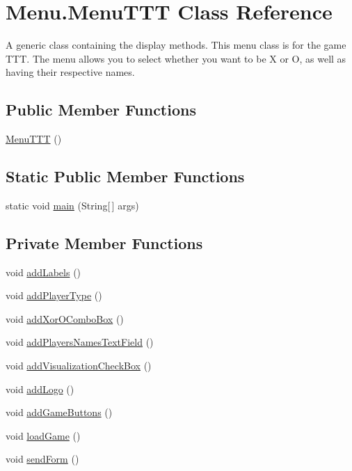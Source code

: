 \hypertarget{class_menu_1_1_menu_t_t_t}{}\section{Menu.\+Menu\+T\+T\+T Class Reference}
\label{class_menu_1_1_menu_t_t_t}


A generic class containing the display methods. This menu class is for the game T\+T\+T. The menu allows you to select whether you want to be X or O, as well as having their respective names.  


\subsection*{Public Member Functions}
\begin{DoxyCompactItemize}
\item 
\hyperlink{class_menu_1_1_menu_t_t_t_ad4e37e7c616519cc089666adf3bda2ad}{Menu\+T\+T\+T} ()
\end{DoxyCompactItemize}
\subsection*{Static Public Member Functions}
\begin{DoxyCompactItemize}
\item 
static void \hyperlink{class_menu_1_1_menu_t_t_t_aadb5ca51346ce541623408f04e806ba3}{main} (String\mbox{[}$\,$\mbox{]} args)
\end{DoxyCompactItemize}
\subsection*{Private Member Functions}
\begin{DoxyCompactItemize}
\item 
void \hyperlink{class_menu_1_1_menu_t_t_t_a48a8d83ac7c6e390507700574ddfabff}{add\+Labels} ()
\item 
void \hyperlink{class_menu_1_1_menu_t_t_t_ae2102ee7da27dee00625b813a5142143}{add\+Player\+Type} ()
\item 
void \hyperlink{class_menu_1_1_menu_t_t_t_ab2e2e48256d680705dac876219d404fb}{add\+Xor\+O\+Combo\+Box} ()
\item 
void \hyperlink{class_menu_1_1_menu_t_t_t_a2ff5a71570235793d9f9792b124cfaa8}{add\+Players\+Names\+Text\+Field} ()
\item 
void \hyperlink{class_menu_1_1_menu_t_t_t_aab64230cfcc735d5d7c921fff67eb371}{add\+Visualization\+Check\+Box} ()
\item 
void \hyperlink{class_menu_1_1_menu_t_t_t_a4f469514054ebd91fb4cf50e17aab7b3}{add\+Logo} ()
\item 
void \hyperlink{class_menu_1_1_menu_t_t_t_a605ea271b36acc1565d95db0c8469bfd}{add\+Game\+Buttons} ()
\item 
void \hyperlink{class_menu_1_1_menu_t_t_t_aeac6a368a9a21c6dc96bc01388f055ef}{load\+Game} ()
\item 
void \hyperlink{class_menu_1_1_menu_t_t_t_a62e5048bd2e1a44f351233f251f78496}{send\+Form} ()
\end{DoxyCompactItemize}

